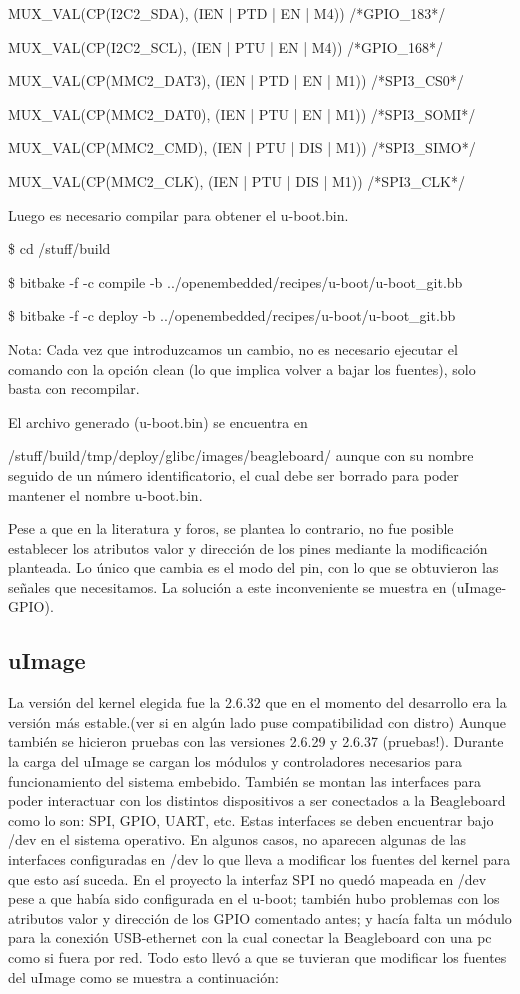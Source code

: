 MUX\_VAL(CP(I2C2\_SDA),		(IEN  | PTD | EN  | M4)) /*GPIO\_183*/\ 

MUX\_VAL(CP(I2C2\_SCL),		(IEN  | PTU | EN  | M4)) /*GPIO\_168*/\ 

MUX\_VAL(CP(MMC2\_DAT3),	(IEN  | PTD | EN  | M1)) /*SPI3\_CS0*/\ 

MUX\_VAL(CP(MMC2\_DAT0),	(IEN  | PTU | EN  | M1)) /*SPI3\_SOMI*/\ 

MUX\_VAL(CP(MMC2\_CMD),		(IEN  | PTU | DIS | M1)) /*SPI3\_SIMO*/\ 

MUX\_VAL(CP(MMC2\_CLK),		(IEN  | PTU | DIS | M1)) /*SPI3\_CLK*/


Luego es necesario compilar para obtener el u-boot.bin.

\$ cd /stuff/build

\$ bitbake -f -c compile -b ../openembedded/recipes/u-boot/u-boot\_git.bb

\$ bitbake -f -c deploy -b ../openembedded/recipes/u-boot/u-boot\_git.bb


Nota: Cada vez que introduzcamos un cambio, no es necesario ejecutar el comando con la opción clean (lo que implica volver a bajar los fuentes), solo basta con recompilar.

El archivo generado (u-boot.bin) se encuentra en 

/stuff/build/tmp/deploy/glibc/images/beagleboard/ aunque con su nombre seguido de un número identificatorio, el cual debe ser borrado para poder mantener el nombre u-boot.bin.

Pese a que en la literatura y foros, se plantea lo contrario, no fue posible establecer los atributos valor y dirección de los pines mediante la modificación planteada. Lo único que cambia es el modo del pin, con lo que se obtuvieron las señales que necesitamos. La solución a este inconveniente se muestra en (uImage-GPIO).


\subsection{uImage}
La versión del kernel elegida fue la 2.6.32 que en el momento del desarrollo era la versión más estable.(ver si en algún lado puse compatibilidad con distro) Aunque también se hicieron pruebas con las versiones 2.6.29 y 2.6.37 (pruebas!).
Durante la carga del uImage se cargan los módulos y controladores necesarios para funcionamiento del sistema embebido. También se montan las interfaces para poder interactuar con los distintos dispositivos a ser conectados a la Beagleboard como lo son: SPI, GPIO, UART, etc. Estas interfaces se deben encuentrar bajo /dev en el sistema operativo. En algunos casos, no aparecen algunas de las interfaces configuradas en /dev lo que lleva a modificar los fuentes del kernel para que esto así suceda. En el proyecto la interfaz SPI no quedó mapeada en /dev pese a que había sido configurada en el u-boot; también hubo problemas con los atributos valor y dirección de los GPIO comentado antes; y hacía falta un módulo para la conexión USB-ethernet con la cual conectar la Beagleboard con una pc como si fuera por red. Todo esto llevó a que se tuvieran que modificar los fuentes del uImage como se muestra a continuación:
 
